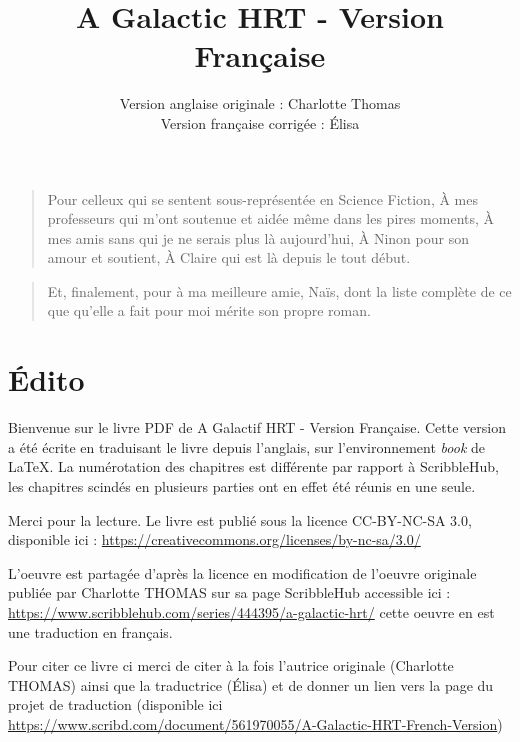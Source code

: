 \documentclass[12pt,hidelinks,a4paper]{book}
\title{A Galactic HRT - Version Française}
\author{Version anglaise originale : Charlotte Thomas \\ Version française corrigée : Élisa}
\renewcommand{\cdot}{\textperiodcentered}
\newenvironment{dedication}
  {\vspace{6ex}\begin{quotation}\begin{em}}
  {\par\end{em}\end{quotation}}
\begin{document}
\maketitle 
\begin{dedication}
  Pour celleux qui se sentent sous-représenté\cdot e en Science Fiction,\newline
  À mes professeurs qui m'ont soutenue et aidée même dans les pires moments,\newline
  À mes amis sans qui je ne serais plus là aujourd'hui,\newline
  À Ninon pour son amour et soutient,\newline
  À Claire qui est là depuis le tout début.
\end{dedication}

\begin{dedication}
  \begin{center}
  Et, finalement, pour à ma meilleure amie, Naïs, dont la liste complète de ce que qu'elle a fait pour moi mérite son propre roman.
  \end{center}
\end{dedication}

\tableofcontents

\chapter*{Édito}

Bienvenue sur le livre PDF de A Galactif HRT - Version Française. Cette version a été
écrite en traduisant le livre depuis l'anglais, sur l'environnement
\textit{book} de \LaTeX .
\bigskip
La numérotation des chapitres est différente par rapport à ScribbleHub,
les chapitres scindés en plusieurs parties ont en effet été réunis
en une seule.

\bigskip
Merci pour la lecture. Le livre est publié sous la licence CC-BY-NC-SA
3.0, disponible ici : \url{https://creativecommons.org/licenses/by-nc-sa/3.0/}

L'oeuvre est partagée d'après la licence en modification de l'oeuvre originale publiée par 
Charlotte THOMAS sur sa page ScribbleHub accessible ici : \url{https://www.scribblehub.com/series/444395/a-galactic-hrt/} cette 
oeuvre en est une traduction en français. \par
\bigskip

Pour citer ce livre ci merci de citer à la fois l'autrice originale (Charlotte THOMAS) ainsi que 
la traductrice (Élisa) et de donner un lien vers la page du projet de traduction (disponible ici \url{https://www.scribd.com/document/561970055/A-Galactic-HRT-French-Version})
\end{document}
